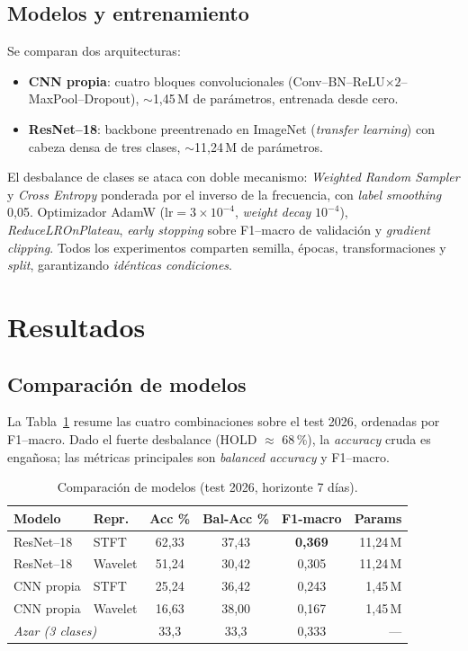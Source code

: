 \documentclass[conference]{IEEEtran}
\begin{document}
\subsection{Modelos y entrenamiento}
Se comparan dos arquitecturas:
\begin{itemize}
  \item \textbf{CNN propia}: cuatro bloques convolucionales
        (Conv--BN--ReLU$\times2$--MaxPool--Dropout), $\sim$1,45\,M de
        parámetros, entrenada desde cero.
  \item \textbf{ResNet--18}: backbone preentrenado en ImageNet
        (\emph{transfer learning}) con cabeza densa de tres clases,
        $\sim$11,24\,M de parámetros.
\end{itemize}
El desbalance de clases se ataca con doble mecanismo: \emph{Weighted Random
Sampler} y \emph{Cross Entropy} ponderada por el inverso de la frecuencia,
con \emph{label smoothing} 0,05. Optimizador AdamW
($\text{lr}=3\times10^{-4}$, \emph{weight decay} $10^{-4}$),
\emph{ReduceLROnPlateau}, \emph{early stopping} sobre F1--macro de
validación y \emph{gradient clipping}. Todos los experimentos comparten
semilla, épocas, transformaciones y \emph{split}, garantizando
\emph{idénticas condiciones}.

\section{Resultados}

\subsection{Comparación de modelos}
La Tabla~\ref{tab:comp} resume las cuatro combinaciones sobre el test 2026,
ordenadas por F1--macro. Dado el fuerte desbalance (HOLD $\approx$ 68\,\%),
la \emph{accuracy} cruda es engañosa; las métricas principales son
\emph{balanced accuracy} y F1--macro.

\begin{table}[t]
\caption{Comparación de modelos (test 2026, horizonte 7 días).}
\label{tab:comp}
\centering
\begin{tabular}{llcccr}
\toprule
\textbf{Modelo} & \textbf{Repr.} & \textbf{Acc \%} & \textbf{Bal-Acc \%} & \textbf{F1-macro} & \textbf{Params} \\
\midrule
ResNet--18 & STFT    & 62,33 & 37,43 & \textbf{0,369} & 11,24\,M \\
ResNet--18 & Wavelet & 51,24 & 30,42 & 0,305 & 11,24\,M \\
CNN propia & STFT    & 25,24 & 36,42 & 0,243 & 1,45\,M \\
CNN propia & Wavelet & 16,63 & 38,00 & 0,167 & 1,45\,M \\
\midrule
\multicolumn{2}{l}{\textit{Azar (3 clases)}} & 33,3 & 33,3 & 0,333 & --- \\
\bottomrule
\end{tabular}
\end{table}
\end{document}
